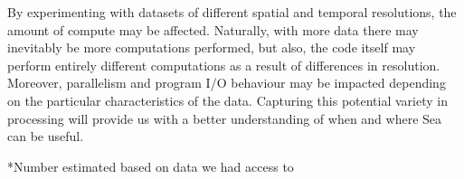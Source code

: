 \documentclass[fleqn,10pt]{wlscirep}
\begin{document}
    By experimenting with datasets of different spatial and temporal
    resolutions, the amount of compute may be affected. Naturally, with more
    data there may inevitably be more computations performed, but also, the code
    itself may perform entirely different computations as a result of
    differences in resolution. Moreover, parallelism and program I/O behaviour
    may be impacted depending on the particular characteristics of the data.
    Capturing this potential variety in processing will provide us with a better
    understanding of when and where Sea can be useful.
    
    \begin{table}[t]
      \small\centering
     \footnotesize{*Number estimated based on data we had access
    to}\\
    \caption{Dataset characteristics. Compressed size is listed, since all
    applications, except for SPM, processed compressed
    data}\label{table:sea-neuro:data}
    \end{table}
    
    
\end{document}
